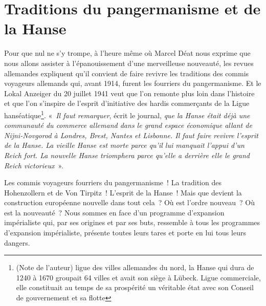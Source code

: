 \documentclass[french,twoside]{book} %
\begin{document}
\section[Traditions du pangermanisme et de la Hanse]{Traditions du pangermanisme et de la Hanse}
\noindent Pour que nul ne s’y trompe, à l’heure même où Marcel Déat nous exprime que nous allons assister à l’épanouissement d’une merveilleuse nouveauté, les revues allemandes expliquent qu’il convient de faire revivre les traditions des commis voyageurs allemands qui, avant 1914, furent les fourriers du pangermanisme. Et le Lokal Anzeiger du 20 juillet 1941 veut que l’on remonte plus loin dans l’histoire et que l’on s’inspire de l’esprit d’initiative des hardis commerçants de la Ligue hanséatique\footnote{(Note de l’auteur) ligue des villes allemandes du nord, la Hanse qui dura de 1240 à 1670 groupait 64 villes et avait son siège à Lübeck. Ligue commerciale, elle constituait au temps de sa prospérité un véritable état avec son Conseil de gouvernement et sa flotte}. « \emph{Il faut remarquer}, écrit le journal, \emph{que la Hanse était déjà une communauté du commerce allemand dans le grand espace économique allant de Nijni-Novgorod à Londres, Brest, Nantes et Lisbonne. Il faut faire revivre l’esprit de la Hanse. La vieille Hanse est morte parce qu’il lui manquait l’appui d’un Reich fort. La nouvelle Hanse triomphera parce qu’elle a derrière elle le grand Reich victorieux} ».\par
Les commis voyageurs fourriers du pangermanisme ! La tradition des Hohenzollern et de Von Tirpitz ! L’esprit de la Hanse ! Mais que devient la construction européenne nouvelle dans tout cela ? Où est l’ordre nouveau ? Où est la nouveauté ? Nous sommes en face d’un programme d’expansion impérialiste qui, par ses origines et par ses buts, ressemble à tous les programmes d’expansion impérialiste, présente toutes leurs tares et porte en lui tous leurs dangers.
\end{document}

